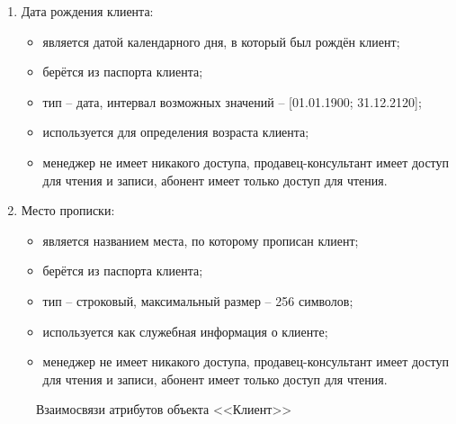 \begin{enumerate}
\begin{enumerate}
        \item Дата рождения клиента:
        \begin{itemize}
            \item является датой календарного дня, в который был рождён клиент;
            \item берётся из паспорта клиента;
            \item тип -- дата, интервал возможных значений -- [01.01.1900; 31.12.2120];
            \item используется для определения возраста клиента;
            \item менеджер не имеет никакого доступа, продавец-консультант имеет доступ для чтения и записи, абонент имеет только доступ для чтения.
        \end{itemize}

        \item Место прописки:
        \begin{itemize}
            \item является названием места, по которому прописан клиент;
            \item берётся из паспорта клиента;
            \item тип -- строковый, максимальный размер -- 256 символов;
            \item используется как служебная информация о клиенте;
            \item менеджер не имеет никакого доступа, продавец-консультант имеет доступ для чтения и записи, абонент имеет только доступ для чтения.
        \end{itemize}
    \end{enumerate}
    \begin{figure}[H]
        \label{fig:client-attributes}
        \caption{Взаимосвязи атрибутов объекта <<Клиент>>}
    \end{figure}


\end{enumerate}
